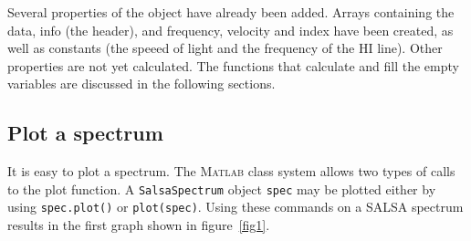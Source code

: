 \documentclass[11pt,a4paper]{article}
\begin{document}
\noindent
Several properties of the object have already been added. Arrays
containing the data, info (the header), and frequency, velocity and
index have been created, as well as constants (the speeed of light and
the frequency of the HI line). Other properties are not yet
calculated. The functions that calculate and fill the empty variables are
discussed in the following sections.

\subsection{Plot a spectrum}
\label{sec:plot-spectrum}

It is easy to plot a spectrum. The \textsc{Matlab} class system allows two
types of calls to the plot function. A \texttt{SalsaSpectrum} object
\lstinline!spec! may be plotted either by using
\lstinline!spec.plot()! or \lstinline!plot(spec)!. Using these
commands on a SALSA spectrum results in the first graph shown in figure~\ref{fig1}.
\end{document}
